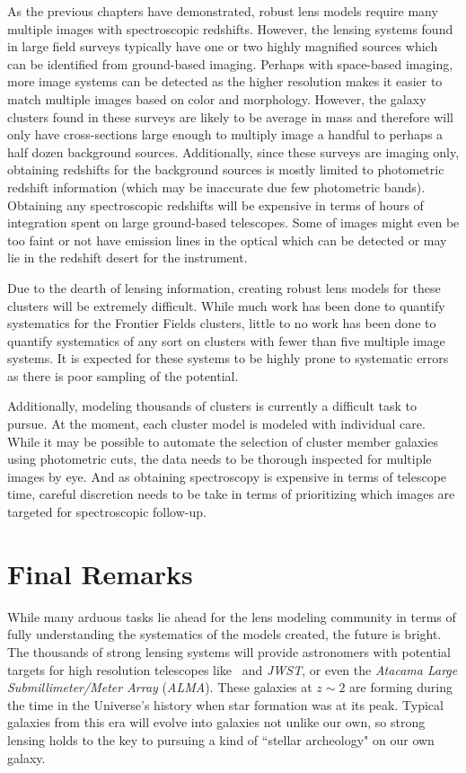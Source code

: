 As the previous chapters have demonstrated, robust lens models require many multiple images with spectroscopic redshifts. However, the lensing systems found in large field surveys typically have one or two highly magnified sources which can be identified from ground-based imaging. Perhaps with space-based imaging, more image systems can be detected as the higher resolution makes it easier to match multiple images based on color and morphology. However, the galaxy clusters found in these surveys are likely to be average in mass and therefore will only have cross-sections large enough to multiply image a handful to perhaps a half dozen background sources. Additionally, since these surveys are imaging only, obtaining redshifts for the background sources is mostly limited to photometric redshift information (which may be inaccurate due few photometric bands). Obtaining any spectroscopic redshifts will be expensive in terms of hours of integration spent on large ground-based telescopes. Some of images might even be too faint or not have emission lines in the optical which can be detected or may lie in the redshift desert for the instrument.

Due to the dearth of lensing information, creating robust lens models for these clusters will be extremely difficult. While much work has been done to quantify systematics for the Frontier Fields clusters, little to no work has been done to quantify systematics of any sort on clusters with fewer than five multiple image systems. It is expected for these systems to be highly prone to systematic errors as there is poor sampling of the potential.

Additionally, modeling thousands of clusters is currently a difficult task to pursue. At the moment, each cluster model is modeled with individual care. While it may be possible to automate the selection of cluster member galaxies using photometric cuts, the data needs to be thorough inspected for multiple images by eye. And as obtaining spectroscopy is expensive in terms of telescope time, careful discretion needs to be take in terms of prioritizing which images are targeted for spectroscopic follow-up.

\section{Final Remarks}

While many arduous tasks lie ahead for the lens modeling community in terms of fully understanding the systematics of the models created, the future is bright. The thousands of strong lensing systems will provide astronomers with potential targets for high resolution telescopes like \hst\ and {\it JWST}, or even the {\it Atacama Large Submillimeter/Meter Array} ({\it ALMA}). These galaxies at $z\sim2$ are forming during the time in the Universe's history when star formation was at its peak. Typical galaxies from this era will evolve into galaxies not unlike our own, so strong lensing holds to the key to pursuing a kind of ``stellar archeology" on our own galaxy.

